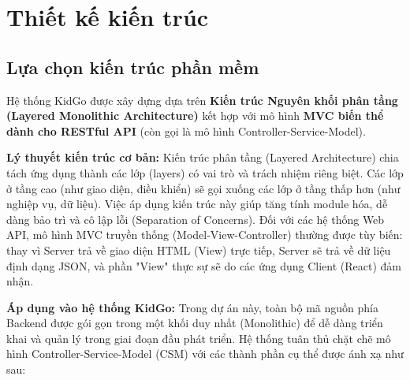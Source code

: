 \documentclass[../DoAn.tex]{subfiles}
\begin{document}
\section{Thiết kế kiến trúc}
\subsection{Lựa chọn kiến trúc phần mềm}
Hệ thống KidGo được xây dựng dựa trên \textbf{Kiến trúc Nguyên khối phân tầng (Layered Monolithic Architecture)} kết hợp với mô hình \textbf{MVC biến thể dành cho RESTful API} (còn gọi là mô hình Controller-Service-Model).

\textbf{Lý thuyết kiến trúc cơ bản:}
Kiến trúc phân tầng (Layered Architecture) chia tách ứng dụng thành các lớp (layers) có vai trò và trách nhiệm riêng biệt. Các lớp ở tầng cao (như giao diện, điều khiển) sẽ gọi xuống các lớp ở tầng thấp hơn (như nghiệp vụ, dữ liệu). Việc áp dụng kiến trúc này giúp tăng tính module hóa, dễ dàng bảo trì và cô lập lỗi (Separation of Concerns). Đối với các hệ thống Web API, mô hình MVC truyền thống (Model-View-Controller) thường được tùy biến: thay vì Server trả về giao diện HTML (View) trực tiếp, Server sẽ trả về dữ liệu định dạng JSON, và phần "View" thực sự sẽ do các ứng dụng Client (React) đảm nhận.

\textbf{Áp dụng vào hệ thống KidGo:}
Trong dự án này, toàn bộ mã nguồn phía Backend được gói gọn trong một khối duy nhất (Monolithic) để dễ dàng triển khai và quản lý trong giai đoạn đầu phát triển. Hệ thống tuân thủ chặt chẽ mô hình Controller-Service-Model (CSM) với các thành phần cụ thể được ánh xạ như sau:
\end{document}
